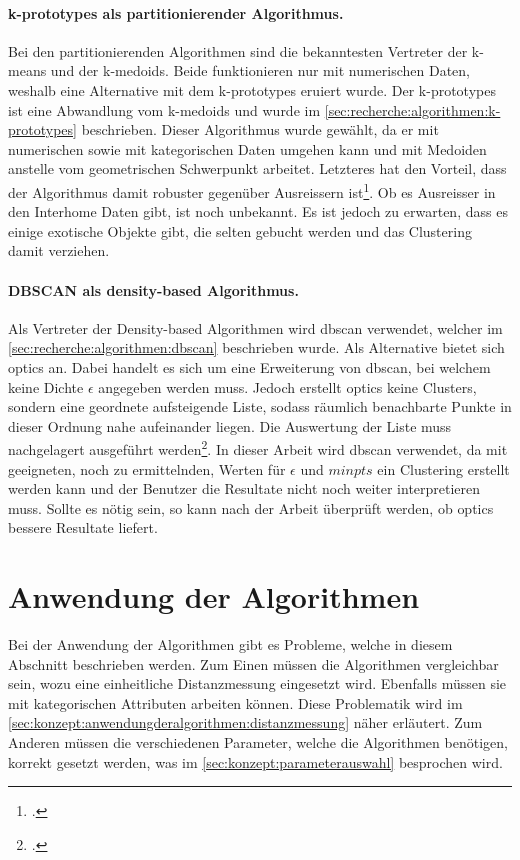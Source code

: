 \paragraph{k-prototypes als partitionierender Algorithmus.}
\label{sec:konzept:algorithmenauswahl:clustering:kprototypes}
Bei den partitionierenden Algorithmen sind die bekanntesten Vertreter der k-means und der k-medoids. Beide funktionieren nur mit numerischen Daten, weshalb eine Alternative mit dem k-prototypes eruiert wurde. Der k-prototypes ist eine Abwandlung vom k-medoids und wurde im \cref{sec:recherche:algorithmen:k-prototypes} beschrieben. Dieser Algorithmus wurde gewählt, da er mit numerischen sowie mit kategorischen Daten umgehen kann und mit Medoiden anstelle vom geometrischen Schwerpunkt arbeitet. Letzteres hat den Vorteil, dass der Algorithmus damit robuster gegenüber Ausreissern ist\footcite{data_mining_concepts_and_techniques}. Ob es Ausreisser in den Interhome Daten gibt, ist noch unbekannt. Es ist jedoch zu erwarten, dass es einige exotische Objekte gibt, die selten gebucht werden und das Clustering damit verziehen. 

\paragraph{DBSCAN als density-based Algorithmus.}
\label{sec:konzept:algorithmenauswahl:clustering:dbscan}
Als Vertreter der Density-based Algorithmen wird \gls{dbscan} verwendet, welcher im \cref{sec:recherche:algorithmen:dbscan} beschrieben wurde. Als Alternative bietet sich \gls{optics} an. Dabei handelt es sich um eine Erweiterung von \gls{dbscan}, bei welchem keine Dichte $\epsilon$ angegeben werden muss. Jedoch erstellt \gls{optics} keine Clusters, sondern eine geordnete aufsteigende Liste, sodass räumlich benachbarte Punkte in dieser Ordnung nahe aufeinander liegen. Die Auswertung der Liste muss nachgelagert ausgeführt werden\footcite{data_mining_concepts_and_techniques}. In dieser Arbeit wird \gls{dbscan} verwendet, da mit geeigneten, noch zu ermittelnden, Werten für $\epsilon$ und $minpts$ ein Clustering erstellt werden kann und der Benutzer die Resultate nicht noch weiter interpretieren muss. Sollte es nötig sein, so kann nach der Arbeit überprüft werden, ob \gls{optics} bessere Resultate liefert.

\section{Anwendung der Algorithmen}
\label{sec:konzept:anwendungderalgorithmen}
Bei der Anwendung der Algorithmen gibt es Probleme, welche in diesem Abschnitt beschrieben werden. Zum Einen müssen die Algorithmen vergleichbar sein, wozu eine einheitliche Distanzmessung eingesetzt wird. Ebenfalls müssen sie mit kategorischen Attributen arbeiten können. Diese Problematik wird im \cref{sec:konzept:anwendungderalgorithmen:distanzmessung} näher erläutert. Zum Anderen müssen die verschiedenen Parameter, welche die Algorithmen benötigen, korrekt gesetzt werden, was im \cref{sec:konzept:parameterauswahl} besprochen wird.

